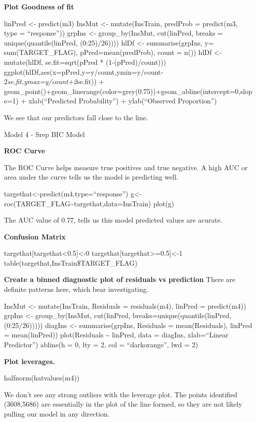 \documentclass[]{article}
\begin{document}
\textbf{Plot Goodness of fit}

linPred \textless- predict(m3) InsMut \textless- mutate(InsTrain,
predProb = predict(m3, type = ``response'')) grpIns \textless-
group\_by(InsMut, cut(linPred, breaks = unique(quantile(linPred,
(0:25)/26)))) hlDf \textless- summarise(grpIns, y= sum(TARGET\_FLAG),
pPred=mean(predProb), count = n()) hlDf \textless- mutate(hlDf,
se.fit=sqrt(pPred * (1-(pPred)/count)))
ggplot(hlDf,aes(x=pPred,y=y/count,ymin=y/count-2\emph{se.fit,ymax=y/count+2}se.fit))
+
geom\_point()+geom\_linerange(color=grey(0.75))+geom\_abline(intercept=0,slope=1)
+ xlab(``Predicted Probability'') + ylab(``Observed Proportion'')

We see that our predictors fall close to the line.

Model 4 - Srep BIC Model

\textbf{ROC Curve}

The ROC Curve helps measure true positives and true negative. A high AUC
or area under the curve tells us the model is predicting well.

targethat\textless-predict(m4,type=``response'')
g\textless-roc(TARGET\_FLAG\textasciitilde targethat,data=InsTrain)
plot(g)

The AUC value of 0.77, tells us this model predicted values are acurate.

\textbf{Confusion Matrix}

targethat{[}targethat\textless0.5{]}\textless-0
targethat{[}targethat\textgreater=0.5{]}\textless-1
table(targethat,InsTrain\$TARGET\_FLAG)

\textbf{Create a binned diagnostic plot of residuals vs prediction}
There are definite patterns here, which bear investigating.

InsMut \textless- mutate(InsTrain, Residuals = residuals(m4), linPred =
predict(m4)) grpIns \textless- group\_by(InsMut, cut(linPred,
breaks=unique(quantile(linPred, (0:25/26))))) diagIns \textless-
summarise(grpIns, Residuals = mean(Residuals), linPred = mean(linPred))
plot(Residuals \textasciitilde{} linPred, data = diagIns, xlab=``Linear
Predictor'') abline(h = 0, lty = 2, col = ``darkorange'', lwd = 2)

\textbf{Plot leverages.}

halfnorm(hatvalues(m4))

We don't see any strong outliers with the leverage plot. The points
identified (3608,5686) are essentially in the plot of the line formed,
so they are not likely pulling our model in any direction.
\end{document}
